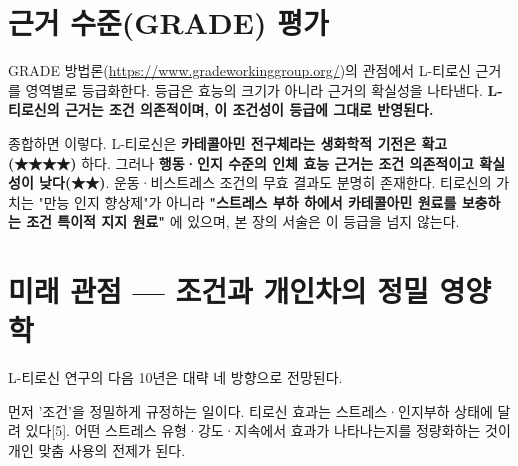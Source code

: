 \documentclass[12pt,oneside]{book}
\begin{document}
\section{근거 수준(GRADE) 평가}

GRADE 방법론(\url{https://www.gradeworkinggroup.org/})의 관점에서 L-티로신 근거를 영역별로 등급화한다. 등급은 효능의 크기가 아니라 근거의 확실성을 나타낸다. \textbf{L-티로신의 근거는 조건 의존적이며, 이 조건성이 등급에 그대로 반영된다.}

\vspace{2pt}\vspace{3pt}

종합하면 이렇다. L-티로신은 \textbf{카테콜아민 전구체라는 생화학적 기전은 확고(★★★★)} 하다. 그러나 \textbf{행동·인지 수준의 인체 효능 근거는 조건 의존적이고 확실성이 낮다(★★)}. 운동·비스트레스 조건의 무효 결과도 분명히 존재한다. 티로신의 가치는 "만능 인지 향상제"가 아니라 \textbf{"스트레스 부하 하에서 카테콜아민 원료를 보충하는 조건 특이적 지지 원료"} 에 있으며, 본 장의 서술은 이 등급을 넘지 않는다.

\section{미래 관점 — 조건과 개인차의 정밀 영양학}

L-티로신 연구의 다음 10년은 대략 네 방향으로 전망된다.

먼저 '조건'을 정밀하게 규정하는 일이다. 티로신 효과는 스트레스·인지부하 상태에 달려 있다[5]. 어떤 스트레스 유형·강도·지속에서 효과가 나타나는지를 정량화하는 것이 개인 맞춤 사용의 전제가 된다.
\end{document}
